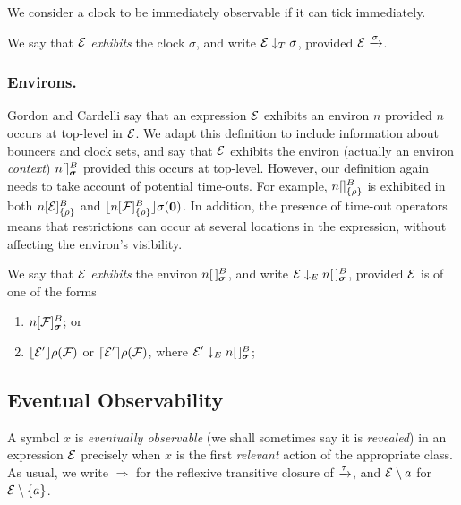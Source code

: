 \documentclass[orivec,envcountsame]{llncs}
\newcommand{\Exhibits}[1]{\mathrel{\downarrow_{#1}}}
\newcommand{\ExhibitsC}{\Exhibits{T}}
\newcommand{\ExhibitsE}{\Exhibits{E}}
\newcommand{\Does}[1]{\xderives{#1}}
\newcommand{\DoesTaus}{\mathrel{\Rightarrow}}
\begin{document}
We consider a clock to be immediately observable if it can tick
immediately.

\begin{definition}
We say that $\text{$\mathcal{E}$}$ \emph{exhibits} the clock $\sigma$, and write $\expr
\ExhibitsC \sigma$, provided $\expr \Does{\sigma}$.
\end{definition}

\subsubsection{Environs.} 

Gordon and Cardelli \cite{GC99} say that an expression $\text{$\mathcal{E}$}$ exhibits an
environ $n$ provided $n$ occurs at top-level in $\text{$\mathcal{E}$}$. We adapt this
definition to include information about bouncers and clock sets, and say that
$\text{$\mathcal{E}$}$ exhibits the environ (actually an environ \emph{context}) $\locv{n}{}{B}{\vec{\sigma}}$
provided this occurs at top-level. However, our definition again needs to
take account of potential time-outs. For example, ${n}[  ]^{B}_{\{\rho\}}$ is
exhibited in both ${n}[ \text{$\mathcal{E}$} ]^{B}_{\{\rho\}}$ and
$\lfloor{{n}[ \text{$\mathcal{F}$}]^{B}_{\{\rho\}}}\rfloor {\sigma} ({\textbf{0}})$. In addition, the presence of
time-out operators means that restrictions can occur at several locations in the
expression, without affecting the environ's visibility.

\begin{definition}
We say that $\text{$\mathcal{E}$}$ \emph{exhibits} the environ $\locv{n}{\,}{B}{\vec{\sigma}}$,
and write $\expr \ExhibitsE \locv{n}{\,}{B}{\vec{\sigma}}$, provided $\text{$\mathcal{E}$}$ is 
of one of the forms

\begin{enumerate}
\item
    $\locv{n}{\exprb}{B}{\vec{\sigma}}$; or
\item
    $\lfloor{\text{$\mathcal{E}$}' }\rfloor {\rho} ({\text{$\mathcal{F}$}})$ or $\lceil{\text{$\mathcal{E}$}' }\rceil {\rho} ({\text{$\mathcal{F}$}})$,
    where $\expr' \ExhibitsE \locv{n}{\,}{B}{\vec{\sigma}}$;
\end{enumerate}
\end{definition}


\subsection{Eventual Observability}
\label{sec:eventual-observability}

A symbol $x$ is \emph{eventually observable} (we shall sometimes say it
is \emph{revealed}) in an expression $\text{$\mathcal{E}$}$ precisely when $x$ is the
first \emph{relevant} action of the appropriate class. As usual, we
write $\DoesTaus$ for the reflexive transitive closure of $\Does{\tau}$, and
$\text{$\mathcal{E}$}\setminus {a}$ for $\text{$\mathcal{E}$}\setminus {\{a\}}$.
\end{document}
